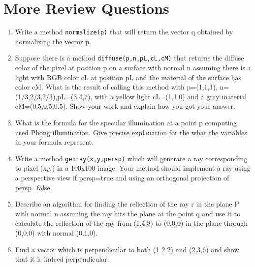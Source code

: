 \documentclass{book}
\begin{document}
\chapter{More Review Questions}
\begin{enumerate}
  \item Write a method {\tt normalize(p)} that will return the vector q obtained by normalizing the vector p.
  \item Suppose there is a method {\tt diffuse(p,n,pL,cL,cM)} that returns the diffuse color of the pixel at position p on a surface with normal n assuming there is a light with RGB color cL at position pL and the material of the surface has color cM. What is the result of calling this method with p=(1,1,1), n=(1/3,2/3,2/3),pL=(3,4,7), with a yellow light cL=(1,1,0) and a gray material cM=(0.5,0.5,0.5). Show your work and explain how you got your answer.
  \item What is the formula for the specular illumination at a point p computing used Phong illumination. Give precise explanation for the what the variables in your formula represent.
  \item Write a method {\tt genray(x,y,persp)} which will generate a ray corresponding to pixel (x,y) in a 100x100 image. Your method should implement a ray using a perspective view if persp=true and using an orthogonal projection of persp=false.
  \item Describe an algorithm for finding the reflection of the ray r in the plane P with normal n assuming the ray hits the plane at the point q and use it to calculate the reflection of the ray from (1,4,8) to (0,0,0) in the plane through (0,0,0) with normal (0,1,0).
  \item Find a vector which is perpendicular to both (1 2 2) and (2,3,6) and show that it is indeed perpendicular.

\end{enumerate}



\begin{figure}
\begin{verbatim}
\end{verbatim}
\end{figure}

\begin{figure}
\begin{verbatim}
\end{verbatim}
\end{figure}
\end{document}
